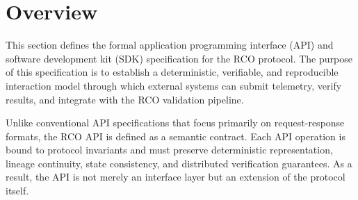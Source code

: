 \section{Overview}

This section defines the formal application programming interface (API) and software development kit (SDK) specification for the RCO protocol. The purpose of this specification is to establish a deterministic, verifiable, and reproducible interaction model through which external systems can submit telemetry, verify results, and integrate with the RCO validation pipeline.

Unlike conventional API specifications that focus primarily on request-response formats, the RCO API is defined as a semantic contract. Each API operation is bound to protocol invariants and must preserve deterministic representation, lineage continuity, state consistency, and distributed verification guarantees. As a result, the API is not merely an interface layer but an extension of the protocol itself.

